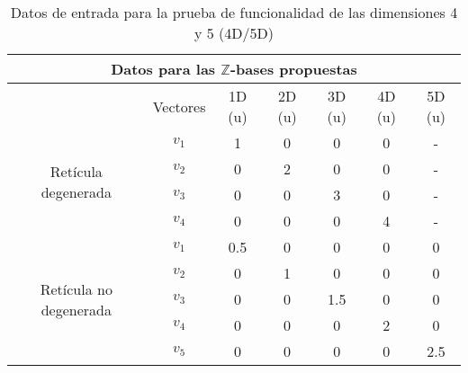 \documentclass{llncs}
\begin{document}

\begin{table}
	\centering
		\caption{Datos de entrada para la prueba de funcionalidad de las dimensiones 4 y 5 (4D/5D)}
	\begin{tabular}{|c|c|c|c|c|c|c|}
	    \hline
		\multicolumn{7}{|c|}{Datos para las $\mathbb{Z}$-bases propuestas} \\
		\hline
		& Vectores & 1D (u) & 2D (u) & 3D (u) & 4D (u) & 5D (u) \\
		\hline
		\multirow{4}{4cm}{Ret\'icula degenerada} & $v_1$ & 1 & 0 & 0 & 0 & - \\ \cline{2-7}
		& $v_2$ & 0 & 2 & 0 & 0 & - \\ \cline{2-7}
		& $v_3$ & 0 & 0 & 3 & 0 & - \\ \cline{2-7}
		& $v_4$ & 0 & 0 & 0 & 4 & - \\ \cline{1-7}
		\multirow{5}{4cm}{Ret\'icula no degenerada} & $v_1$ & 0.5 & 0 & 0 & 0 & 0 \\ \cline{2-7}
		& $v_2$ & 0 & 1 & 0 & 0 & 0 \\ \cline{2-7}
		& $v_3$ & 0 & 0 & 1.5 & 0 & 0\\ \cline{2-7}
		& $v_4$ & 0 & 0 & 0 & 2 & 0\\ \cline{2-7}
		& $v_5$ & 0 & 0 & 0 & 0 & 2.5\\ \cline{1-7}
	\end{tabular}
	\label{tabla:4Dy5D}
\end{table}
\end{document}
